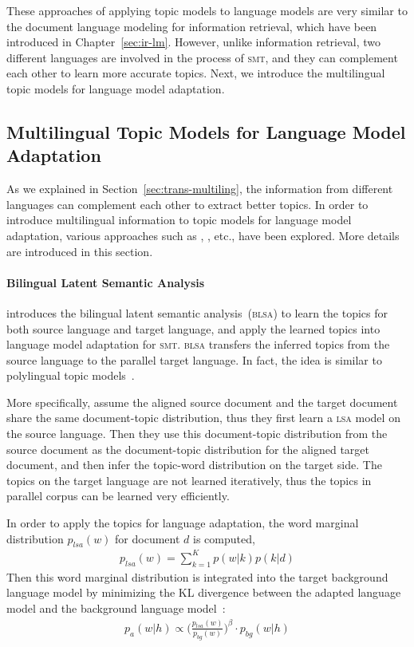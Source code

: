 These approaches of applying topic models to language models are very
similar to the document language modeling for information retrieval,
which have been introduced in Chapter~\ref{sec:ir-lm}. However, unlike
information retrieval, two different languages are involved in the
process of \textsc{smt}, and they can complement each other to learn
more accurate topics. Next, we introduce the multilingual topic models
for language model adaptation.

\subsection{Multilingual Topic Models for Language Model Adaptation}

As we explained in Section~\ref{sec:trans-multiling}, the information
from different languages can complement each other to extract better
topics. In order to introduce multilingual information to topic models
for language model adaptation, various approaches such as
\cite{Tam-2007}, \cite{Ruiz-2011}, \cite{Yu-2013} etc., have been
explored. More details are introduced in this section.


\paragraph{Bilingual Latent Semantic Analysis}

\cite{Tam-2007} introduces the bilingual latent semantic
analysis~(\textsc{blsa}) to learn the topics for both source language
and target language, and apply the learned topics into language model
adaptation for \textsc{smt}. \textsc{blsa} transfers the inferred
topics from the source language to the parallel target language. In
fact, the idea is similar to polylingual topic
models~\citep{mimno-09}.

More specifically, \cite{Tam-2007} assume the aligned source document
and the target document share the same document-topic distribution,
thus they first learn a \textsc{lsa} model on the source
language. Then they use this document-topic distribution from the
source document as the document-topic distribution for the aligned
target document, and then infer the topic-word distribution on the
target side. The topics on the target language are not learned
iteratively, thus the topics in parallel corpus can be learned very
efficiently.

In order to apply the topics for language adaptation, the word
marginal distribution $p_{lsa}(w)$ for document $d$ is computed,
\begin{align}
p_{lsa}(w) = \sum_{k=1}^K p(w|k) p(k|d)
\end{align}
Then this word marginal distribution is integrated into the target background language model by minimizing the KL divergence between the adapted language model and the background language model~\citep{Kneser-1997b}:
\begin{align}
\label{eq:mdi}
p_a(w|h) \propto \Big( \frac{p_{lsa}(w)}{p_{bg}(w)} \Big) ^{\beta} \cdot p_{bg}(w|h)
\end{align}

